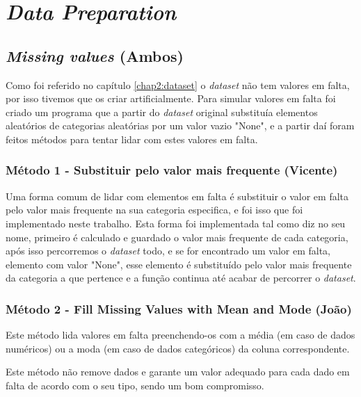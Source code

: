 \chapter{\textit{Data Preparation}}
\label{chap:data_prep}


\section{\textit{Missing values} (Ambos)}
\label{chap3:missing_values}

Como foi referido no capítulo \ref{chap2:dataset} o \textit{dataset} não tem valores em falta, por isso tivemos que os criar artificialmente. Para simular valores em falta foi criado um programa que a partir do \textit{dataset} original substituía elementos aleatórios de categorias aleatórias por um valor vazio "None", e a partir daí foram feitos métodos para tentar lidar com estes valores em falta.

\subsection{Método 1 - Substituir pelo valor mais frequente (Vicente)}
\label{chap3:metodo1}

Uma forma comum de lidar com elementos em falta é substituir o valor em falta pelo valor mais frequente na sua categoria especifica, e foi isso que foi implementado neste trabalho. Esta forma foi implementada tal como diz no seu nome, primeiro é calculado e guardado o valor mais frequente de cada categoria, após isso percorremos o \textit{dataset} todo, e se for encontrado um valor em falta, elemento com valor "None", esse elemento é substituído pelo valor mais frequente da categoria a que pertence e a função continua até acabar de percorrer o \textit{dataset}.

\subsection{Método 2 - Fill Missing Values with Mean and Mode (João)}
\label{chap3:metodo2}

Este método lida valores em falta preenchendo-os com a média (em caso de dados numéricos) ou a moda (em caso de dados categóricos) da coluna correspondente.

Este método não remove dados e garante um valor adequado para cada dado em falta de acordo com o seu tipo, sendo um bom compromisso.



